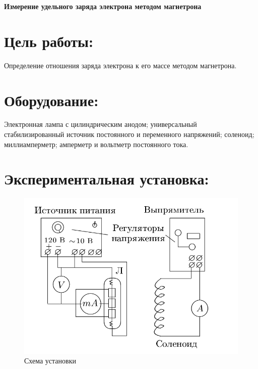 \documentclass[a4paper, fontsize=14pt]{article}
\begin{document}
\parindent=1cm


\huge
\centering
\textbf{Измерение удельного заряда электрона методом магнетрона}

\raggedright
\large
\section*{Цель работы:}
Определение отношения заряда электрона к его массе методом магнетрона.
\section*{Оборудование:}
Электронная лампа с цилиндрическим анодом; универсальный стабилизированный источник постоянного и переменного напряжений; соленоид; миллиамперметр; амперметр и вольтметр постоянного тока.
\section*{Экспериментальная установка:}
\begin{figure}[H]
\center
\includegraphics[scale=0.4]{ust.png}
\caption{Схема установки}
\end{figure}
\end{document}
